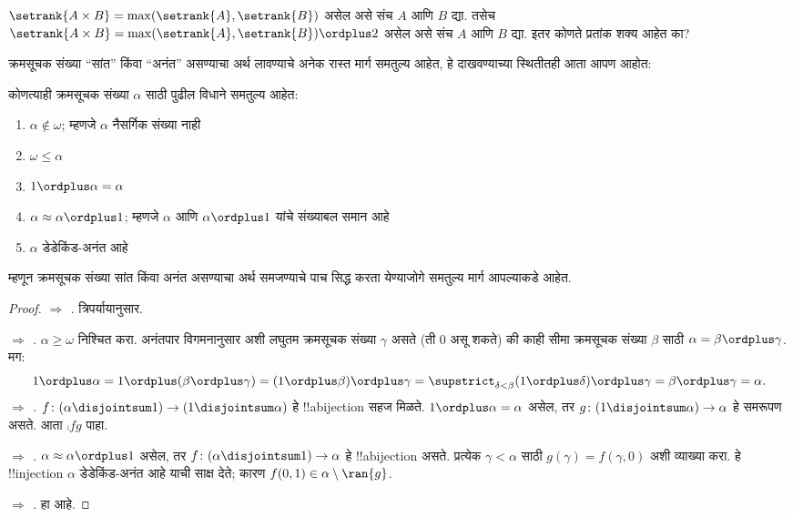 \documentclass[../../../include/open-logic-section]{subfiles}
\begin{document}
\begin{prob}
$\setrank{A \times B}=
\max(\setrank{A}, \setrank{B})$ असेल असे संच $A$ आणि $B$ द्या. तसेच $\setrank{A \times B}= \max(\setrank{A}, \setrank{B}) \ordplus  2$ असेल असे संच $A$ आणि $B$ द्या. इतर कोणते प्रतांक शक्य आहेत का?
\end{prob}

क्रमसूचक संख्या “सांत” किंवा “अनंत” असण्याचा अर्थ लावण्याचे अनेक रास्त मार्ग समतुल्य आहेत, हे दाखवण्याच्या स्थितीतही आता आपण आहोत:

\begin{lem}
कोणत्याही क्रमसूचक संख्या $\alpha$ साठी पुढील विधाने समतुल्य आहेत:
\begin{enumerate}
  \item{} $\alpha\notin \omega$; म्हणजे $\alpha$ नैसर्गिक संख्या नाही
  \item{} $\omega \leq \alpha$
  \item{} $1 \ordplus  \alpha = \alpha$
  \item{} $\alpha \approx \alpha\ordplus 1$; म्हणजे $\alpha$ आणि $\alpha\ordplus 1$ यांचे संख्याबल समान आहे
  \item{} $\alpha$ डेडेकिंड-अनंत आहे
  \end{enumerate}
\end{lem}
\noindent
म्हणून क्रमसूचक संख्या सांत किंवा अनंत असण्याचा अर्थ समजण्याचे पाच सिद्ध करता येण्याजोगे समतुल्य मार्ग आपल्याकडे आहेत.

\begin{proof}
\emph{ $\Rightarrow$ .} त्रिपर्यायानुसार.

\emph{ $\Rightarrow$ .} $\alpha \geq \omega$ निश्चित करा. अनंतपार विगमनानुसार अशी लघुतम क्रमसूचक संख्या $\gamma$ असते (ती $0$ असू शकते) की काही सीमा क्रमसूचक संख्या $\beta$ साठी $\alpha = \beta \ordplus \gamma$. मग:
\[
  1 \ordplus \alpha =
  1 \ordplus (\beta \ordplus \gamma) =
  (1 \ordplus \beta) \ordplus \gamma =
  \supstrict_{\delta < \beta} (1 \ordplus  \delta) \ordplus  \gamma =
  \beta \ordplus  \gamma =
  \alpha.
\]
\emph{ $\Rightarrow$ .} $f \colon (\alpha \disjointsum 1) \to (1
\disjointsum \alpha)$ हे !!a{bijection} सहज मिळते. $1 \ordplus \alpha = \alpha$ असेल, तर $g \colon (1 \disjointsum \alpha) \to \alpha$ हे समरूपण असते. आता $\comp{f}{g}$ पाहा.

\emph{ $\Rightarrow$ .} $\alpha \approx \alpha \ordplus 1$ असेल, तर $f \colon
(\alpha \disjointsum 1) \to \alpha$ हे !!a{bijection} असते. प्रत्येक $\gamma < \alpha$ साठी $g(\gamma) = f(\gamma, 0)$ अशी व्याख्या करा. हे !!{injection} $\alpha$ डेडेकिंड-अनंत आहे याची साक्ष देते; कारण $f(0,1) \in \alpha \setminus \ran{g}$.

\emph{ $\Rightarrow$ .} हा  आहे.
\end{proof}
\end{document}
